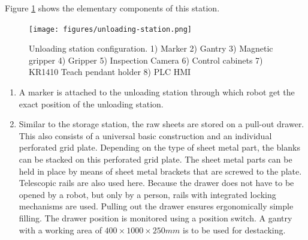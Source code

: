 Figure \ref{fig:unloading-station-main} shows the elementary components of this station.


\begin{figure}[h]
    \centering
    \texttt{[image: figures/unloading-station.png]}
    \caption{Unloading station configuration. 1) Marker 2) Gantry 3) Magnetic gripper 4) Gripper 5) Inspection Camera 6) Control cabinets 7) KR1410 Teach pendant holder
    8) PLC HMI} 
    \label{fig:unloading-station-main}
\end{figure}


\begin{enumerate}
    \item A marker is attached to the unloading station through which robot get the exact position of the unloading station.
    \item Similar to the storage station, the raw sheets are stored on a pull-out drawer. This also consists
    of a universal basic construction and an individual perforated grid plate. Depending on the type of
    sheet metal part, the blanks can be stacked on this perforated grid plate. The sheet metal parts can be
    held in place by means of sheet metal brackets that are screwed to the plate. Telescopic rails are also
    used here. Because the drawer does not have to be opened by a robot, but only by a person, rails with
    integrated locking mechanisms are used. Pulling out the drawer ensures ergonomically simple
    filling. The drawer position is monitored using a position switch. A gantry with a working area of $400 \times 1000 \times 250 mm$ is to be used for destacking.
    

\end{enumerate}
